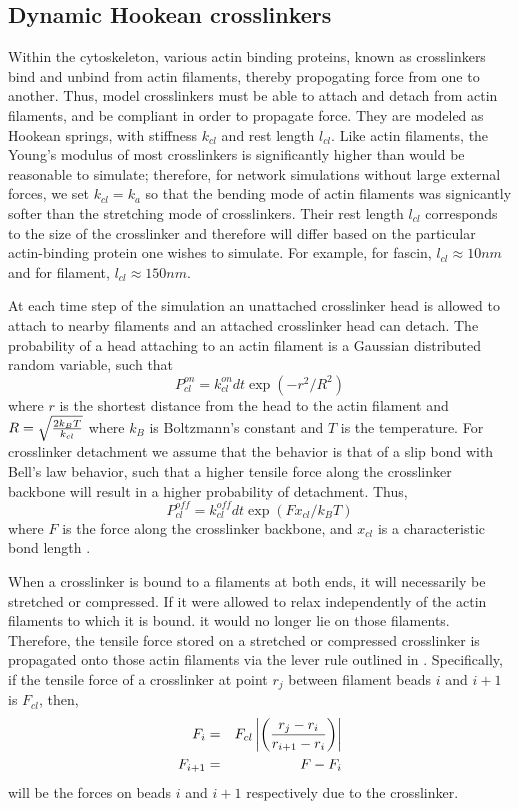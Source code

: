 \documentclass[12pt]{article}
\begin{document}
\subsection{Dynamic Hookean crosslinkers}
Within the cytoskeleton, various actin binding proteins, known as crosslinkers 
bind and unbind from actin filaments, thereby propogating force from one to
another. Thus, model crosslinkers must be able to attach and detach from actin filaments,
and be compliant in order to propagate force. They are modeled as Hookean springs, with stiffness
$k_{cl}$ and rest length $l_{cl}$. Like actin filaments, the Young's modulus of
most crosslinkers is significantly higher than would be reasonable to simulate; 
therefore, for network simulations without large external forces, we set $k_{cl}=k_a$ 
so that the bending mode of actin filaments was signicantly softer than the stretching mode of
crosslinkers. Their rest length $l_{cl}$ corresponds to the size of the crosslinker
and therefore will differ based on the particular actin-binding protein one wishes to simulate. 
For example, for fascin, $l_{cl}\approx10nm$ and for filament, $l_{cl}\approx150 nm$.
\par
At each time step of the simulation an unattached crosslinker head is allowed to attach to nearby
filaments and an attached crosslinker head can detach. 
The probability of a head attaching to an actin filament is a Gaussian distributed random variable, such that
\begin{equation}
  P_{cl}^{on} = k_{cl}^{on}dt\exp(-r^2/R^2)
  \label{eqn:cl_on}
\end{equation} 
where $r$ is the shortest distance from the head to the actin filament and $R = \sqrt{2k_B T\over k_{cl}}$ 
where $k_B$ is Boltzmann's constant and $T$ is the temperature. 
For crosslinker detachment we assume that the behavior is that of a slip bond with Bell's law behavior, 
such that a higher
tensile force along the crosslinker backbone will result in a higher probability of detachment\cite{bell1978}. Thus, 
\begin{equation}
  P_{cl}^{off} = k_{cl}^{off} dt\exp{\left(  F x_{cl}/k_B T\right)}  
  \label{eqn:cl_off}
\end{equation}
where $F$ is the force along the crosslinker backbone, and $x_{cl}$ is a characteristic bond length \cite{stam2015}. 
\par
When a crosslinker is bound to a filaments at both ends, it will necessarily be stretched or compressed. 
If it were allowed to relax independently of the actin filaments to which it is bound. 
it would no longer lie on those filaments. Therefore, the tensile force stored on a stretched or compressed
crosslinker is propagated onto those actin filaments via the lever rule outlined in 
\cite{nedelec2002, gordon2012}. Specifically, if the tensile force of a crosslinker at point $r_j$ between 
filament beads $i$ and $i+1$ is $F_{cl}$, then, 
\begin{eqnarray} 
  F_i &=& F_{cl}\left|\left( {r_j - r_i \over r_{i+1} - r_i }\right)\right|\\\nonumber
  F_{i+1} &=& F-F_i 
  \label{eqn:lever}
\end{eqnarray}
will be the forces on beads $i$ and $i+1$ respectively due to the crosslinker.
\end{document}
